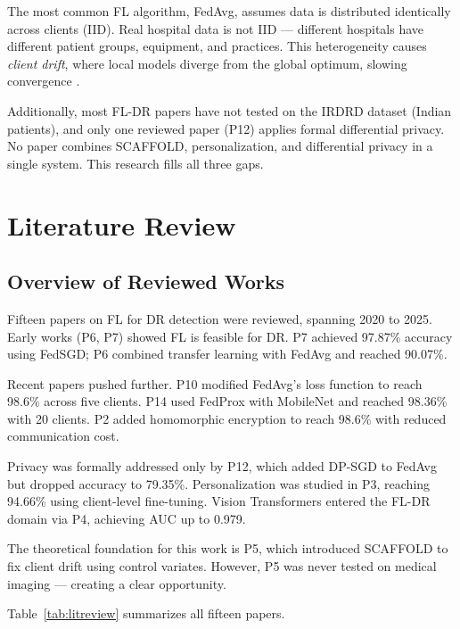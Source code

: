\documentclass[12pt, a4paper]{article}
\begin{document}
The most common FL algorithm, FedAvg, assumes data is distributed identically across clients (IID). Real hospital data is not IID --- different hospitals have different patient groups, equipment, and practices. This heterogeneity causes \textit{client drift}, where local models diverge from the global optimum, slowing convergence \cite{p5}.

Additionally, most FL-DR papers have not tested on the IRDRD dataset (Indian patients), and only one reviewed paper (P12) applies formal differential privacy. No paper combines SCAFFOLD, personalization, and differential privacy in a single system. This research fills all three gaps.

\section{Literature Review}

\subsection{Overview of Reviewed Works}

Fifteen papers on FL for DR detection were reviewed, spanning 2020 to 2025. Early works (P6, P7) showed FL is feasible for DR. P7 achieved 97.87\% accuracy using FedSGD; P6 combined transfer learning with FedAvg and reached 90.07\%.

Recent papers pushed further. P10 modified FedAvg's loss function to reach 98.6\% across five clients. P14 used FedProx with MobileNet and reached 98.36\% with 20 clients. P2 added homomorphic encryption to reach 98.6\% with reduced communication cost.

Privacy was formally addressed only by P12, which added DP-SGD to FedAvg but dropped accuracy to 79.35\%. Personalization was studied in P3, reaching 94.66\% using client-level fine-tuning. Vision Transformers entered the FL-DR domain via P4, achieving AUC up to 0.979.

The theoretical foundation for this work is P5, which introduced SCAFFOLD to fix client drift using control variates. However, P5 was never tested on medical imaging --- creating a clear opportunity.

Table~\ref{tab:litreview} summarizes all fifteen papers.

\newpage
\end{document}
